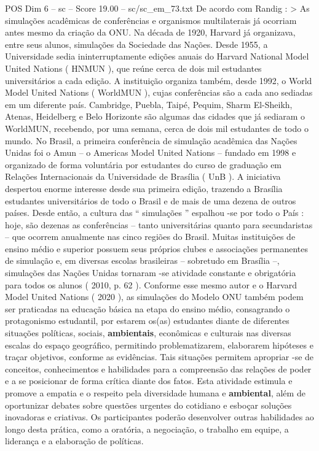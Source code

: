 \begin{textsample}{POS Dim 6 – sc – Score 19.00 – sc/sc\_em\_73.txt}
De acordo com Randig : > As simulações acadêmicas de conferências e organismos multilaterais já ocorriam antes mesmo da criação da ONU.
Na década de 1920, Harvard já organizava, entre seus alunos, simulações da Sociedade das Nações.
Desde 1955, a Universidade sedia ininterruptamente edições anuais do Harvard National Model United Nations ( HNMUN ), que reúne cerca de dois mil estudantes universitários a cada edição.
A instituição organiza também, desde 1992, o World Model United Nations ( WorldMUN ), cujas conferências são a cada ano sediadas em um diferente país.
Cambridge, Puebla, Taipé, Pequim, Sharm El-Sheikh, Atenas, Heidelberg e Belo Horizonte são algumas das cidades que já sediaram o WorldMUN, recebendo, por uma semana, cerca de dois mil estudantes de todo o mundo.
No Brasil, a primeira conferência de simulação acadêmica das Nações Unidas foi o Amun – o Americas Model United Nations – fundado em 1998 e organizado de forma voluntária por estudantes do curso de graduação em Relações Internacionais da Universidade de Brasília ( UnB ).
A iniciativa despertou enorme interesse desde sua primeira edição, trazendo a Brasília estudantes universitários de todo o Brasil e de mais de uma dezena de outros países.
Desde então, a cultura das “ simulações ” espalhou -se por todo o País : hoje, são dezenas as conferências – tanto universitárias quanto para secundaristas – que ocorrem anualmente nas cinco regiões do Brasil.
Muitas instituições de ensino médio e superior possuem seus próprios clubes e associações permanentes de simulação e, em diversas escolas brasileiras – sobretudo em Brasília –, simulações das Nações Unidas tornaram -se atividade constante e obrigatória para todos os alunos ( 2010, p. 62 ).
Conforme esse mesmo autor e o Harvard Model United Nations ( 2020 ), as simulações do Modelo ONU também podem ser praticadas na educação básica na etapa do ensino médio, consagrando o protagonismo estudantil, por estarem os(as) estudantes diante de diferentes situações políticas, sociais, \textbf{ambientais}, econômicas e culturais nas diversas escalas do espaço geográfico, permitindo problematizarem, elaborarem hipóteses e traçar objetivos, conforme as evidências.
Tais situações permitem apropriar -se de conceitos, conhecimentos e habilidades para a compreensão das relações de poder e a se posicionar de forma crítica diante dos fatos.
Esta atividade estimula e promove a empatia e o respeito pela diversidade humana e \textbf{ambiental}, além de oportunizar debates sobre questões urgentes do cotidiano e esboçar soluções inovadoras e criativas.
Os participantes poderão desenvolver outras habilidades ao longo desta prática, como a oratória, a negociação, o trabalho em equipe, a liderança e a elaboração de políticas.

\end{textsample}
